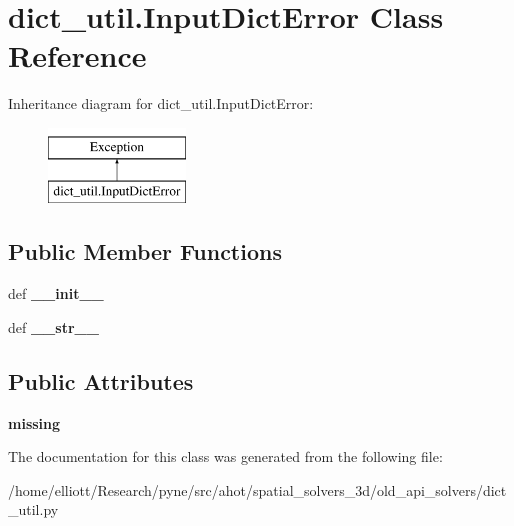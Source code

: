 \hypertarget{classdict__util_1_1_input_dict_error}{\section{dict\-\_\-util.\-Input\-Dict\-Error Class Reference}
\label{classdict__util_1_1_input_dict_error}
}
Inheritance diagram for dict\-\_\-util.\-Input\-Dict\-Error\-:\begin{figure}[H]
\begin{center}
\leavevmode
\includegraphics[height=2.000000cm]{classdict__util_1_1_input_dict_error}
\end{center}
\end{figure}
\subsection*{Public Member Functions}
\begin{DoxyCompactItemize}
\item 
\hypertarget{classdict__util_1_1_input_dict_error_a4e97e96ffaf431264fbaa99f89aa4e36}{def {\bfseries \-\_\-\-\_\-init\-\_\-\-\_\-}}\label{classdict__util_1_1_input_dict_error_a4e97e96ffaf431264fbaa99f89aa4e36}

\item 
\hypertarget{classdict__util_1_1_input_dict_error_a7227b403f5bdaba9ef675cb9cf1111e8}{def {\bfseries \-\_\-\-\_\-str\-\_\-\-\_\-}}\label{classdict__util_1_1_input_dict_error_a7227b403f5bdaba9ef675cb9cf1111e8}

\end{DoxyCompactItemize}
\subsection*{Public Attributes}
\begin{DoxyCompactItemize}
\item 
\hypertarget{classdict__util_1_1_input_dict_error_aa2ebc135b20ddafa9bae59e28bf417f1}{{\bfseries missing}}\label{classdict__util_1_1_input_dict_error_aa2ebc135b20ddafa9bae59e28bf417f1}

\end{DoxyCompactItemize}


The documentation for this class was generated from the following file\-:\begin{DoxyCompactItemize}
\item 
/home/elliott/\-Research/pyne/src/ahot/spatial\-\_\-solvers\-\_\-3d/old\-\_\-api\-\_\-solvers/dict\-\_\-util.\-py\end{DoxyCompactItemize}
